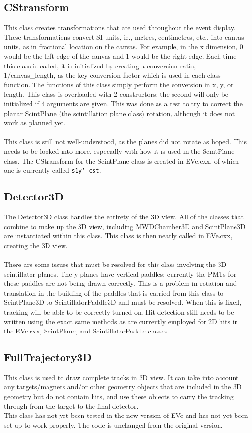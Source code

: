 \documentclass[12pt]{article}
\numberwithin{equation}{section}
\begin{document}
\subsection{CStransform}
This class creates transformations that are used throughout the event display. These transformations convert SI units, ie., metres, centimetres, etc., into canvas units, as in fractional location on the canvas. For example, in the x dimension, 0 would be the left edge of the canvas and 1 would be the right edge. Each time this class is called, it is initialized by creating a conversion ratio, 1/canvas\_length, as the key conversion factor which is used in each class function. The functions of this class simply perform the conversion in x, y, or length. This class is overloaded with 2 constructors; the second will only be initialized if 4 arguments are given. This was done as a test to try to correct the planar ScintPlane (the scintillation plane class) rotation, although it does not work as planned yet. 
\\
\\
This class is still not well-understood, as the planes did not rotate as hoped. This needs to be looked into more, especially with how it is used in the ScintPlane class. The CStransform for the ScintPlane class is created in EVe.cxx, of which one is currently called \texttt{s1y\char`_cst}.

\subsection{Detector3D}
The Detector3D class handles the entirety of the 3D view. All of the classes that combine to make up the 3D view, including MWDChamber3D and ScintPlane3D are instantiated within this class. This class is then neatly called in EVe.cxx, creating the 3D view.
\\
\\
There are some issues that must be resolved for this class involving the 3D scintillator planes. The y planes have vertical paddles; currently the PMTs for these paddles are not being drawn correctly. This is a problem in rotation and translation in the building of the paddles that is carried from this class to ScintPlane3D to ScintillatorPaddle3D and must be resolved. When this is fixed, tracking will be able to be correctly turned on. Hit detection still needs to be written using the exact same methods as are currently employed for 2D hits in the EVe.cxx, ScintPlane, and ScintillatorPaddle classes.

\subsection{FullTrajectory3D}
This class is used to draw complete tracks in 3D view. It can take into account any targets/magnets and/or other geometry objects that are included in the 3D geometry but do not contain hits, and use these objects to carry the tracking through from the target to the final detector.
\\
This class has not yet been tested in the new version of EVe and has not yet been set up to work properly. The code is unchanged from the original version.
\end{document}
